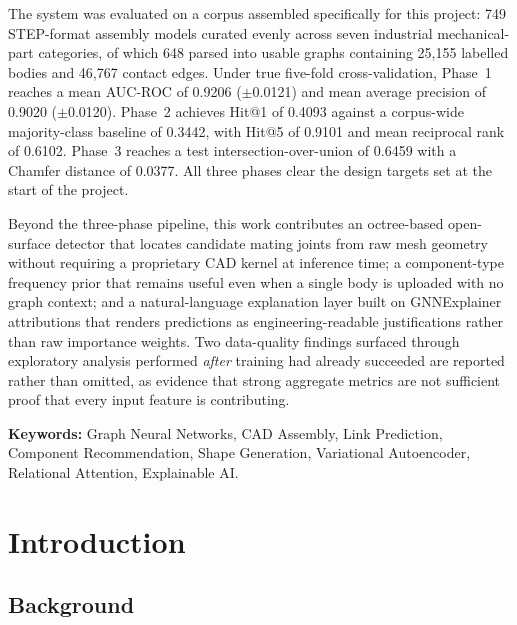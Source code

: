 \documentclass[12pt,oneside,a4paper]{report}
\begin{document}
The system was evaluated on a corpus assembled specifically for this project:
749 STEP-format assembly models curated evenly across seven industrial
mechanical-part categories, of which 648 parsed into usable graphs containing
25,155 labelled bodies and 46,767 contact edges. Under true five-fold
cross-validation, Phase~1 reaches a mean AUC-ROC of 0.9206 ($\pm$0.0121) and
mean average precision of 0.9020 ($\pm$0.0120). Phase~2 achieves Hit@1 of
0.4093 against a corpus-wide majority-class baseline of 0.3442, with Hit@5 of
0.9101 and mean reciprocal rank of 0.6102. Phase~3 reaches a test
intersection-over-union of 0.6459 with a Chamfer distance of 0.0377. All
three phases clear the design targets set at the start of the project.

Beyond the three-phase pipeline, this work contributes an octree-based
open-surface detector that locates candidate mating joints from raw mesh
geometry without requiring a proprietary CAD kernel at inference time; a
component-type frequency prior that remains useful even when a single body is
uploaded with no graph context; and a natural-language explanation layer
built on GNNExplainer attributions that renders predictions as
engineering-readable justifications rather than raw importance weights. Two
data-quality findings surfaced through exploratory analysis performed
\emph{after} training had already succeeded are reported rather than omitted,
as evidence that strong aggregate metrics are not sufficient proof that every
input feature is contributing.

\vspace{0.8em}
\noindent\textbf{Keywords:} Graph Neural Networks, CAD Assembly, Link
Prediction, Component Recommendation, Shape Generation, Variational
Autoencoder, Relational Attention, Explainable AI.

\newpage
\tableofcontents
\newpage
\listoffigures
\newpage
\listoftables
\newpage

\setcounter{page}{1}

\chapter{Introduction}

\section{Background}
\end{document}
